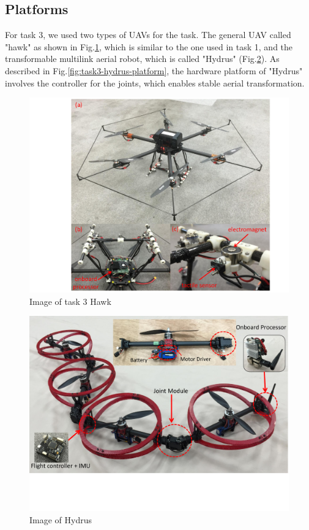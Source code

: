 \documentclass{standalone}
\begin{document}
\subsection{Platforms}
For task 3, we used two types of UAVs for the task. The general UAV called "hawk" as shown in Fig.\ref{fig:task3-hawk}, which is similar to the one used in task 1, and the transformable multilink aerial robot, which is called "Hydrus" (Fig.\ref{fig:task3-hydrus}). As described in Fig.\ref{fig:task3-hydrus-platform}, the hardware platform of "Hydrus" involves the controller for the joints, which enables stable aerial transformation.

\begin{figure}[h]
  \begin{center}
    \includegraphics[clip,  bb=115 4 666 535,  width=\columnwidth]{sections/task3/images/task3-tarrot810.pdf}
    \caption{Image of task 3 Hawk}
    \label{fig:task3-hawk}
  \end{center}
\end{figure} 

\begin{figure}[h]
  \begin{center}
    \includegraphics[clip,  bb=0 105 720 535,  width=\columnwidth]{sections/task3/images/task3-hydrus.pdf}
    \caption{Image of Hydrus}
    \label{fig:task3-hydrus}
  \end{center}
\end{figure} 
\end{document}
